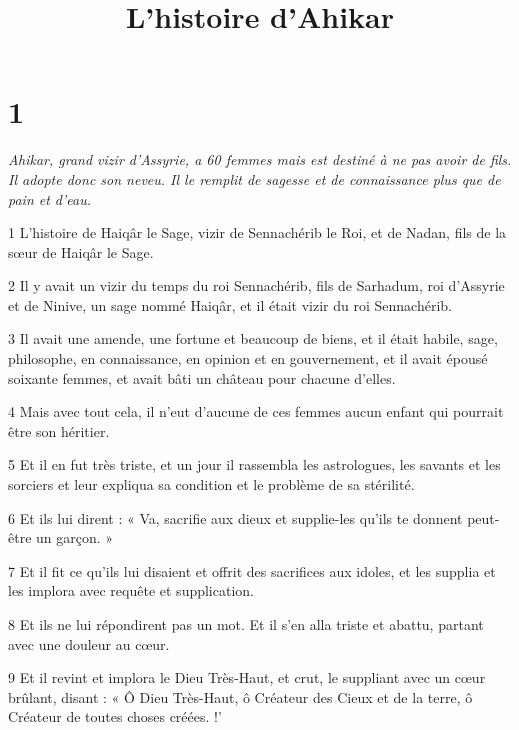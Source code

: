 

\title{L'histoire d'Ahikar}

\chapter{1}

\par \textit{Ahikar, grand vizir d'Assyrie, a 60 femmes mais est destiné à ne pas avoir de fils. Il adopte donc son neveu. Il le remplit de sagesse et de connaissance plus que de pain et d'eau.}

\par 1 L'histoire de Haiqâr le Sage, vizir de Sennachérib le Roi, et de Nadan, fils de la sœur de Haiqâr le Sage.

\par 2 Il y avait un vizir du temps du roi Sennachérib, fils de Sarhadum, roi d'Assyrie et de Ninive, un sage nommé Haiqâr, et il était vizir du roi Sennachérib.

\par 3 Il avait une amende, une fortune et beaucoup de biens, et il était habile, sage, philosophe, en connaissance, en opinion et en gouvernement, et il avait épousé soixante femmes, et avait bâti un château pour chacune d'elles.

\par 4 Mais avec tout cela, il n’eut d’aucune de ces femmes aucun enfant qui pourrait être son héritier.

\par 5 Et il en fut très triste, et un jour il rassembla les astrologues, les savants et les sorciers et leur expliqua sa condition et le problème de sa stérilité.

\par 6 Et ils lui dirent : « Va, sacrifie aux dieux et supplie-les qu'ils te donnent peut-être un garçon. »

\par 7 Et il fit ce qu'ils lui disaient et offrit des sacrifices aux idoles, et les supplia et les implora avec requête et supplication.

\par 8 Et ils ne lui répondirent pas un mot. Et il s'en alla triste et abattu, partant avec une douleur au cœur.

\par 9 Et il revint et implora le Dieu Très-Haut, et crut, le suppliant avec un cœur brûlant, disant : « Ô Dieu Très-Haut, ô Créateur des Cieux et de la terre, ô Créateur de toutes choses créées. !'

